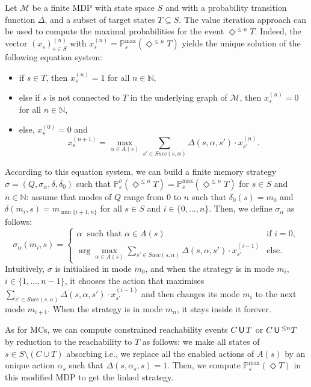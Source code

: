 \begin{theorem}
  Let $\mathcal{M}$ be a finite MDP with state space $S$ and with a probability transition function $\Delta$, and a subset of target states $T \subseteq S$. The value iteration approach can be used to compute the maximal probabilities for the event $\Diamond^{\leq n}T$.
  Indeed, the vector $(x_s)^{(n)}_{s \in S}$ with $x_s^{(n)} = \mathbb{P}^{\max}_s(\Diamond^{\leq n} T)$ yields the unique solution of the following equation system:
  \begin{itemize}
    \item if $s \in T$, then $x_s^{(n)}=1$ for all $n \in \mathbb{N}$,
    \item else if $s$ is not connected to $T$ in the underlying graph of $\mathcal{M}$, then $x_s^{(n)}=0$
    for all $n \in \mathbb{N}$,
    \item else, $x_s^{(0)} = 0$ and
    \[ x_s^{(n+1)} = \max_{\alpha \in A(s)} \sum_{s' \in Succ(s, \alpha)} \Delta(s, \alpha, s') \cdot x_{s'}^{(n)}. \]
  \end{itemize}
  According to this equation system, we can build a finite memory strategy $\sigma = (Q, \sigma_\alpha, \delta, \delta_0)$ such that $\mathbb{P}^\sigma_s(\Diamond^{\leq n} T) = \mathbb{P}^{\max}_s(\Diamond^{\leq n} T)$ for $s \in S$ and $n \in \mathbb{N}$:
  assume that modes of $Q$ range from $0$ to $n$ such that $\delta_0(s) = m_0$ and $\delta(m_i, s) = m_{\min\{i+1, n\}}$ for all $s \in S$ and $i \in \{0, \dots, n\}$. Then, we define $\sigma_\alpha$ as follows:
  \[
    \sigma_\alpha(m_i, s) =
    \begin{cases}
      \alpha \; \text{ such that } \alpha \in A(s) &\text{if }i=0,\\
      \arg \max_{\alpha \in A(s)} \sum_{s' \in Succ(s, \alpha)} \Delta(s, \alpha, s') \cdot x_{s'}^{(i-1)}
      & \text{else.}
    \end{cases}
  \]
  Intuitively, $\sigma$ is initialised in mode $m_0$, and when the strategy is in mode $m_i$, $i \in \{1, \dots, n-1\}$,
  it chooses the action that maximises $\sum_{s' \in Succ(s, \alpha)} \Delta(s, \alpha, s') \cdot x_{s'}^{(i-1)}$ and then changes its mode $m_i$ to the next mode $m_{i+1}$. When the strategy is in mode $m_n$, it stays inside it forever.
\end{theorem}
As for MCs, we can compute constrained reachability events $C \,\text{\sffamily U}\, T$ or $C \,\text{\sffamily U}\,^{\leq n} T$ by reduction to the reachability to $T$ as follows:
we make all states of $s \in S \setminus (C \cup T)$ absorbing i.e., we replace all the enabled actions of $A(s)$
by an unique action $\alpha_s$ such that $\Delta(s, \alpha_s, s) = 1$.
Then, we compute $\mathbb{P}^{\max}_s(\Diamond T)$ in this modified MDP to get the linked strategy.
